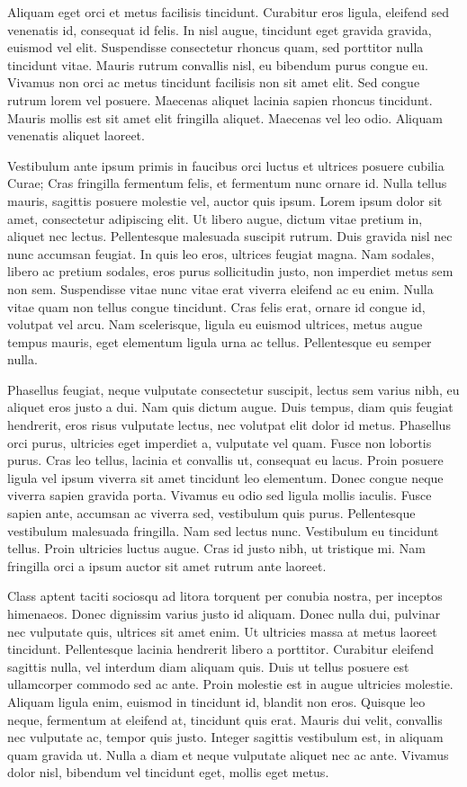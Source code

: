 \documentclass{EPUProjetDi}
\begin{document}
Aliquam eget orci et metus facilisis tincidunt. Curabitur eros ligula, eleifend sed venenatis id, consequat id felis. In nisl augue, tincidunt eget gravida gravida, euismod vel elit. Suspendisse consectetur rhoncus quam, sed porttitor nulla tincidunt vitae. Mauris rutrum convallis nisl, eu bibendum purus congue eu. Vivamus non orci ac metus tincidunt facilisis non sit amet elit. Sed congue rutrum lorem vel posuere. Maecenas aliquet lacinia sapien rhoncus tincidunt. Mauris mollis est sit amet elit fringilla aliquet. Maecenas vel leo odio. Aliquam venenatis aliquet laoreet.

Vestibulum ante ipsum primis in faucibus orci luctus et ultrices posuere cubilia Curae; Cras fringilla fermentum felis, et fermentum nunc ornare id. Nulla tellus mauris, sagittis posuere molestie vel, auctor quis ipsum. Lorem ipsum dolor sit amet, consectetur adipiscing elit. Ut libero augue, dictum vitae pretium in, aliquet nec lectus. Pellentesque malesuada suscipit rutrum. Duis gravida nisl nec nunc accumsan feugiat. In quis leo eros, ultrices feugiat magna. Nam sodales, libero ac pretium sodales, eros purus sollicitudin justo, non imperdiet metus sem non sem. Suspendisse vitae nunc vitae erat viverra eleifend ac eu enim. Nulla vitae quam non tellus congue tincidunt. Cras felis erat, ornare id congue id, volutpat vel arcu. Nam scelerisque, ligula eu euismod ultrices, metus augue tempus mauris, eget elementum ligula urna ac tellus. Pellentesque eu semper nulla.

Phasellus feugiat, neque vulputate consectetur suscipit, lectus sem varius nibh, eu aliquet eros justo a dui. Nam quis dictum augue. Duis tempus, diam quis feugiat hendrerit, eros risus vulputate lectus, nec volutpat elit dolor id metus. Phasellus orci purus, ultricies eget imperdiet a, vulputate vel quam. Fusce non lobortis purus. Cras leo tellus, lacinia et convallis ut, consequat eu lacus. Proin posuere ligula vel ipsum viverra sit amet tincidunt leo elementum. Donec congue neque viverra sapien gravida porta. Vivamus eu odio sed ligula mollis iaculis. Fusce sapien ante, accumsan ac viverra sed, vestibulum quis purus. Pellentesque vestibulum malesuada fringilla. Nam sed lectus nunc. Vestibulum eu tincidunt tellus. Proin ultricies luctus augue. Cras id justo nibh, ut tristique mi. Nam fringilla orci a ipsum auctor sit amet rutrum ante laoreet.

Class aptent taciti sociosqu ad litora torquent per conubia nostra, per inceptos himenaeos. Donec dignissim varius justo id aliquam. Donec nulla dui, pulvinar nec vulputate quis, ultrices sit amet enim. Ut ultricies massa at metus laoreet tincidunt. Pellentesque lacinia hendrerit libero a porttitor. Curabitur eleifend sagittis nulla, vel interdum diam aliquam quis. Duis ut tellus posuere est ullamcorper commodo sed ac ante. Proin molestie est in augue ultricies molestie. Aliquam ligula enim, euismod in tincidunt id, blandit non eros. Quisque leo neque, fermentum at eleifend at, tincidunt quis erat. Mauris dui velit, convallis nec vulputate ac, tempor quis justo. Integer sagittis vestibulum est, in aliquam quam gravida ut. Nulla a diam et neque vulputate aliquet nec ac ante. Vivamus dolor nisl, bibendum vel tincidunt eget, mollis eget metus.
\end{document}
